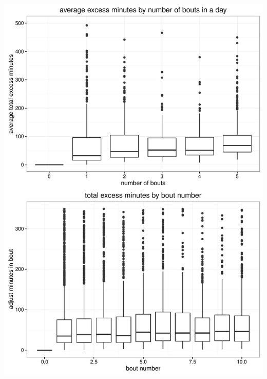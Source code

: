 \documentclass[11pt]{article}\usepackage[]{graphicx}\usepackage[]{color}
\makeatletter
\def\maxwidth{ %
  \ifdim\Gin@nat@width>\linewidth
    \linewidth
  \else
    \Gin@nat@width
  \fi
}
\newenvironment{knitrout}{}{} %
\makeatother
\begin{document}
\begin{knitrout}
\color{fgcolor}
\includegraphics[width=\maxwidth]{figure/p2b-1} 

\end{knitrout}
\end{document}
